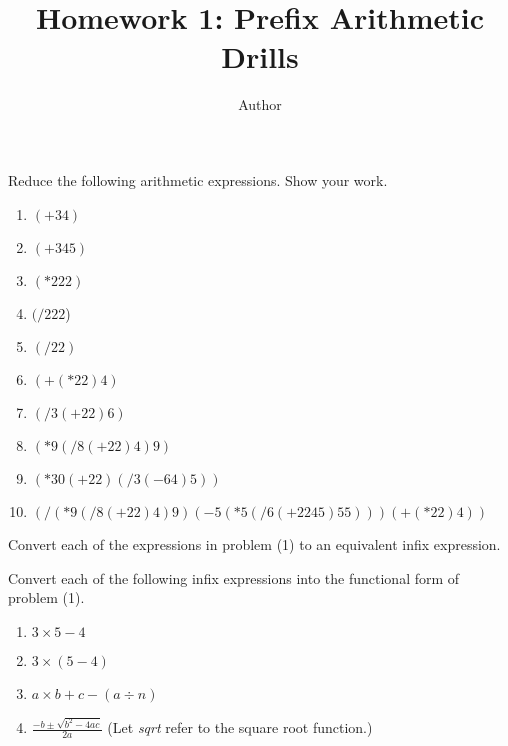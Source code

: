 \documentclass[12pt]{article}
\newenvironment{problem}[2][Problem]{\begin{trivlist}
\item[\hskip \labelsep {\bfseries #1}\hskip \labelsep {\bfseries #2.}]}{\end{trivlist}}
\begin{document}
 
 
\title{Homework 1: Prefix Arithmetic Drills}
\author{Author}
\maketitle

 
\begin{problem}{1}
  Reduce the following arithmetic expressions. Show your work.
  \begin{enumerate}[label=\alph*.]
  \item $(+ 3 4)$
  \item $(+ 3 4 5)$
  \item $(* 2 2 2)$
  \item $(/ 2 2 2$)
  \item $(/ 2 2)$
  \item $(+ (* 2 2) 4)$
  \item $(/ 3 (+ 2 2) 6)$
  \item $(* 9 (/ 8 (+ 2 2) 4) 9)$
  \item $(* 30 (+ 2 2) (/ 3 (- 6 4) 5))$
  \item $(/ (* 9 (/ 8 (+ 2 2) 4) 9) (- 5 (* 5(/ 6 (+ 2 2 4 5) 5 5))) (+ (* 2 2) 4))$ 
  \end{enumerate}
\end{problem}

\begin{problem}{2}
  Convert each of the expressions in problem (1) to an equivalent infix expression.

\end{problem}  

\begin{problem}{3}
  Convert each of the following infix expressions into the functional form of problem (1).
  \begin{enumerate}[label=\alph*.]
  \item $3 \times 5 - 4$
  \item $3 \times (5 - 4)$
  \item $a \times b + c - (a \div n)$
  \item $\frac{-b\pm\sqrt{b^2-4ac}}{2a}$  (Let \textit{sqrt} refer to the square root function.)
  \end{enumerate}
\end{problem}


 
\end{document}

